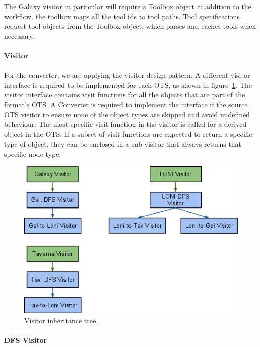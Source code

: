 \documentclass[12pt]{article}
\begin{document}
The Galaxy visitor in particular will require a Toolbox object in addition to the workflow. the toolbox maps all the tool ids to tool paths. Tool specifications request tool objects from the Toolbox object, which parses and caches tools when necessary.

\paragraph{Visitor}

For the converter, we are applying the visitor design pattern. A different visitor interface is required to be implemented for each OTS, as shown in figure~\ref{fig:visitorinheritance}.  The visitor interface contains visit functions for all the objects that are part of the format's OTS. A Converter is required to implement the interface if the source OTS visitor to ensure none of the object types are skipped and avoid undefined behaviour. The most specific visit function in the visitor is called for a derived object in the OTS.  If a subset of visit functions are expected to return a specific type of object, they can be enclosed in a sub-visitor that always returns that specific node type.

\begin{figure}
\centering
\includegraphics[width=\textwidth]{visitorinheritance.png}
\caption{Visitor inheritance tree.}
\label{fig:visitorinheritance}
\end{figure}

\paragraph{DFS Visitor}
\end{document}
